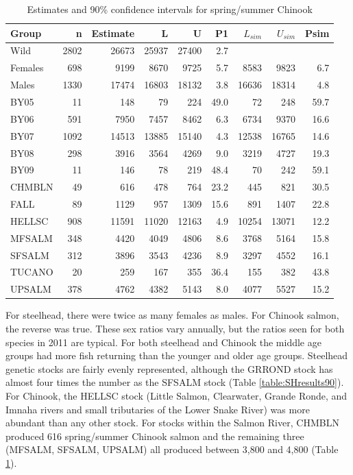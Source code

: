 \documentclass[12pt]{article}
\begin{document}
\begin{table}
\caption{Estimates and 90\% confidence intervals for spring/summer Chinook}
\label{table:CHresults90} 
\begin{center}
\begin{tabular}{|l|r|r|r|r|r|r|r|r|}
\hline Group & n & Estimate & L & U & P1 & $L_{sim}$ & $U_{sim}$ & Psim \\ 
\hline  Wild&2802&26673  &25937 &27400  &2.7 &  &  & \\ 
\hline  Females&698&9199  &8670  &9725  &5.7 &8583  &9823  &6.7 \\ 
\hline  Males&1330&17474  &16803  &18132  &3.8 &16636  &18314  &4.8 \\ 
\hline  BY05&11&148  &79  &224  &49.0 &72  &248  & 59.7\\ 
\hline  BY06&591&7950  &7457  &8462  &6.3 &6734  &9370  &16.6 \\ 
\hline  BY07&1092&14513  &13885  &15140  &4.3 &12538  &16765  &14.6 \\ 
\hline  BY08&298& 3916 &3564  &4269  &9.0 &3219  &4727  & 19.3 \\ 
\hline  BY09&11&146  &78  &219  &48.4 &70  &242  &59.1 \\ 
\hline  CHMBLN&49&616  &478  &764  &23.2 &445  &821  &30.5 \\ 
\hline  FALL&89&1129  &957  &1309  &15.6 &891  &1407  &22.8 \\ 
\hline  HELLSC&908&11591  &11020  &12163  &4.9 &10254  &13071  & 12.2\\ 
\hline  MFSALM&348&4420  &4049  &4806  &8.6 &3768  &5164  &15.8 \\ 
\hline  SFSALM&312&3896  &3543  &4236  &8.9 &3297  &4552  &16.1 \\ 
\hline  TUCANO&20&259  &167 &355  &36.4 &155  &382  &43.8 \\ 
\hline  UPSALM&378&4762  &4382  &5143  &8.0 &4077  &5527  &15.2 \\ 
\hline 
\end{tabular}
\end{center}
\end{table}

For steelhead, there were twice as many females as males. For Chinook salmon, the reverse was true. These sex ratios vary annually, but the ratios seen for both species in 2011 are typical. For both steelhead and Chinook the middle age groups had more fish returning than the younger and older age groups. Steelhead genetic stocks are fairly evenly represented, although the GRROND stock has almost four times the number as the SFSALM stock (Table \ref{table:SHresults90}). For Chinook, the HELLSC stock (Little Salmon, Clearwater, Grande Ronde, and Imnaha rivers and small tributaries of the Lower Snake River) was more abundant than any other stock. For stocks within the Salmon River, CHMBLN produced 616 spring/summer Chinook salmon and the remaining three (MFSALM, SFSALM, UPSALM) all produced between 3,800 and 4,800 (Table \ref{table:CHresults90}). 
\end{document}
